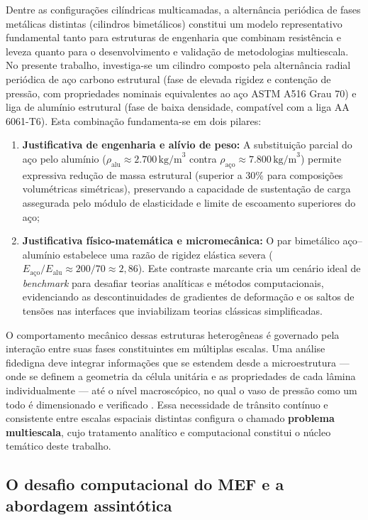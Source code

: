 Dentre as configurações cilíndricas multicamadas, a alternância periódica de fases metálicas distintas (cilindros bimetálicos) constitui um modelo representativo fundamental tanto para estruturas de engenharia que combinam resistência e leveza quanto para o desenvolvimento e validação de metodologias multiescala. No presente trabalho, investiga-se um cilindro composto pela alternância radial periódica de aço carbono estrutural (fase de elevada rigidez e contenção de pressão, com propriedades nominais equivalentes ao aço ASTM A516 Grau 70) e liga de alumínio estrutural (fase de baixa densidade, compatível com a liga AA 6061-T6). Esta combinação fundamenta-se em dois pilares:
\begin{enumerate}
    \item \textbf{Justificativa de engenharia e alívio de peso:} A substituição parcial do aço pelo alumínio ($\rho_{\text{alu}} \approx 2.700 \, \text{kg/m}^3$ contra $\rho_{\text{aço}} \approx 7.800 \, \text{kg/m}^3$) permite expressiva redução de massa estrutural (superior a $30\%$ para composições volumétricas simétricas), preservando a capacidade de sustentação de carga assegurada pelo módulo de elasticidade e limite de escoamento superiores do aço;
    \item \textbf{Justificativa físico-matemática e micromecânica:} O par bimetálico aço--alumínio estabelece uma razão de rigidez elástica severa ($E_{\text{aço}}/E_{\text{alu}} \approx 200/70 \approx 2{,}86$). Este contraste marcante cria um cenário ideal de \textit{benchmark} para desafiar teorias analíticas e métodos computacionais, evidenciando as descontinuidades de gradientes de deformação e os saltos de tensões nas interfaces que inviabilizam teorias clássicas simplificadas.
\end{enumerate}

O comportamento mecânico dessas estruturas heterogêneas é governado pela interação entre suas fases constituintes em múltiplas escalas. Uma análise fidedigna deve integrar informações que se estendem desde a microestrutura — onde se definem a geometria da célula unitária e as propriedades de cada lâmina individualmente — até o nível macroscópico, no qual o vaso de pressão como um todo é dimensionado e verificado \cite{PartonReport}. Essa necessidade de trânsito contínuo e consistente entre escalas espaciais distintas configura o chamado \textbf{problema multiescala}, cujo tratamento analítico e computacional constitui o núcleo temático deste trabalho.

\subsection{O desafio computacional do MEF e a abordagem assintótica}


